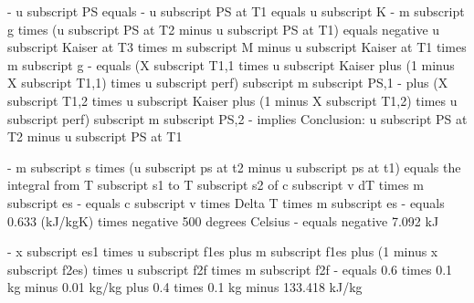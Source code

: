 - u subscript PS equals
- u subscript PS at T1 equals u subscript K
- m subscript g times (u subscript PS at T2 minus u subscript PS at T1) equals negative u subscript Kaiser at T3 times m subscript M minus u subscript Kaiser at T1 times m subscript g
- equals (X subscript T1,1 times u subscript Kaiser plus (1 minus X subscript T1,1) times u subscript perf) subscript m subscript PS,1
- plus (X subscript T1,2 times u subscript Kaiser plus (1 minus X subscript T1,2) times u subscript perf) subscript m subscript PS,2
- implies Conclusion: u subscript PS at T2 minus u subscript PS at T1

- m subscript s times (u subscript ps at t2 minus u subscript ps at t1) equals the integral from T subscript s1 to T subscript s2 of c subscript v dT times m subscript es
- equals c subscript v times Delta T times m subscript es
- equals 0.633 (kJ/kgK) times negative 500 degrees Celsius
- equals negative 7.092 kJ

- x subscript es1 times u subscript f1es plus m subscript f1es plus (1 minus x subscript f2es) times u subscript f2f times m subscript f2f
- equals 0.6 times 0.1 kg minus 0.01 kg/kg plus 0.4 times 0.1 kg minus 133.418 kJ/kg